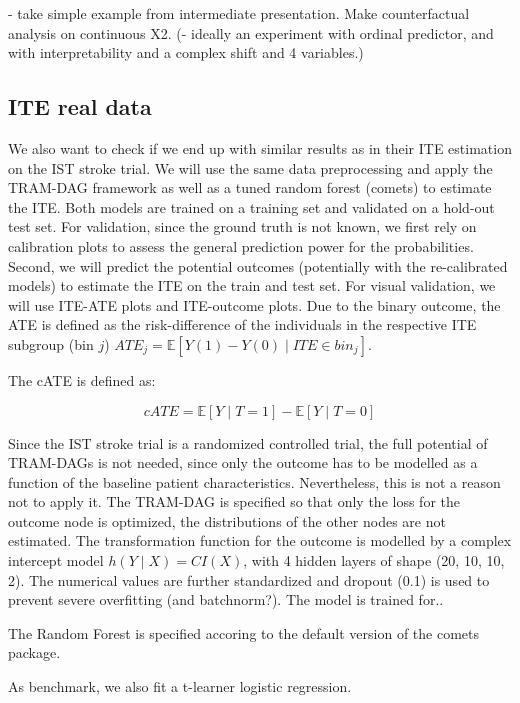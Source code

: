 - take simple example from intermediate presentation. Make counterfactual analysis on continuous X2.
(- ideally an experiment with ordinal predictor, and with interpretability and a complex shift and 4 variables.)



\subsection{ITE real data}

We also want to check if we end up with similar results as \citet{chen2025} in their ITE estimation on the IST stroke trial. We will use the same data preprocessing and apply the TRAM-DAG framework as well as a tuned random forest (comets) to estimate the ITE. Both models are trained on a training set and validated on a hold-out test set. For validation, since the ground truth is not known, we first rely on calibration plots to assess the general prediction power for the probabilities. Second, we will predict the potential outcomes (potentially with the re-calibrated models) to estimate the ITE on the train and test set. For visual validation, we will use ITE-ATE plots and ITE-outcome plots. Due to the binary outcome, the ATE is defined as the risk-difference of the individuals in the respective ITE subgroup (bin $j$) $ATE_j = \mathbb{E}[Y(1) - Y(0) \mid ITE \in bin_j]$.

The cATE is defined as:

\begin{equation}
cATE = \mathbb{E}[Y \mid T = 1] - \mathbb{E}[Y \mid T = 0]
\end{equation}

Since the IST stroke trial is a randomized controlled trial, the full potential of TRAM-DAGs is not needed, since only the outcome has to be modelled as a function of the baseline patient characteristics. Nevertheless, this is not a reason not to apply it. The TRAM-DAG is specified so that only the loss for the outcome node is optimized, the distributions of the other nodes are not estimated. The transformation function for the outcome is modelled by a complex intercept model $h(Y \mid X) = CI(X)$, with 4 hidden layers of shape (20, 10, 10, 2). The numerical values are further standardized and dropout (0.1) is used to prevent severe overfitting (and batchnorm?). The model is trained for..

The Random Forest is specified accoring to the default version of the comets package.

As benchmark, we also fit a t-learner logistic regression.


